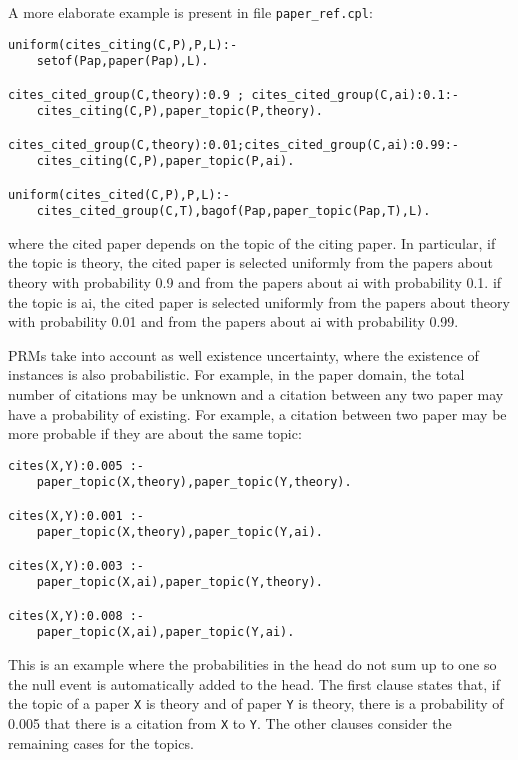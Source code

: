 \documentclass[a4paper,10pt]{scrartcl}
\begin{document}
A more elaborate example is present in file \verb|paper_ref.cpl|:
\begin{verbatim}
uniform(cites_citing(C,P),P,L):-
    setof(Pap,paper(Pap),L).

cites_cited_group(C,theory):0.9 ; cites_cited_group(C,ai):0.1:-
    cites_citing(C,P),paper_topic(P,theory).

cites_cited_group(C,theory):0.01;cites_cited_group(C,ai):0.99:-
    cites_citing(C,P),paper_topic(P,ai).

uniform(cites_cited(C,P),P,L):-
    cites_cited_group(C,T),bagof(Pap,paper_topic(Pap,T),L).
\end{verbatim}
where the cited paper depends on the topic of the citing paper. In particular, if the topic is theory, the cited paper is selected uniformly  from the papers about theory with probability 0.9 and from the papers about ai with probability 0.1. if the topic is ai, the cited paper is selected uniformly  from the papers about theory with probability 0.01 and from the papers about ai with probability 0.99.

PRMs take into account as well existence uncertainty, where the existence of instances is also probabilistic. For example, in the paper domain, the total number of citations may be unknown and  a citation between any two paper may have a probability of existing. For example, a citation between two paper may be more probable if they are about the same topic:
\begin{verbatim}
cites(X,Y):0.005 :- 
    paper_topic(X,theory),paper_topic(Y,theory).

cites(X,Y):0.001 :- 
    paper_topic(X,theory),paper_topic(Y,ai).

cites(X,Y):0.003 :- 
    paper_topic(X,ai),paper_topic(Y,theory).

cites(X,Y):0.008 :- 
    paper_topic(X,ai),paper_topic(Y,ai).
\end{verbatim}
This is an example where the probabilities in the head do not sum up to one so the null event is automatically added to the head.
The first clause states that, if the topic of a paper \texttt{X} is theory and  of  paper \texttt{Y} is theory, there is a probability of 0.005 that there is a citation from \texttt{X} to \texttt{Y}. The other clauses consider the remaining cases for the topics.
\end{document}
